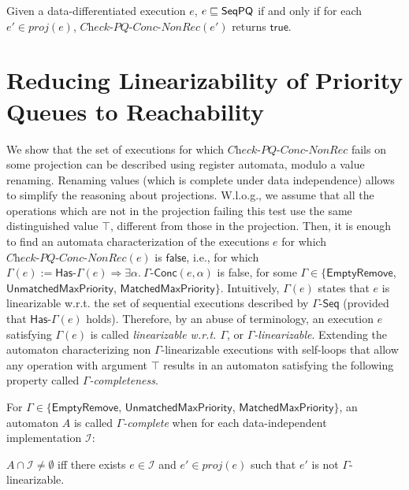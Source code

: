 \documentclass[a4paper,UKenglish]{lipics-v2016}
\begin{document}
\begin{lemma}
\label{lemma:EPQ as multi in MRpri for history}
Given a data-differentiated execution $e$, $e \sqsubseteq \mathsf{SeqPQ}$ if and only if for each $e' \in \textit{proj}(e)$, $\textit{Check-PQ-Conc-NonRec}(e')$ returns $\mathsf{true}$.
\end{lemma}








 







\section{Reducing Linearizability of Priority Queues to Reachability}
\label{sec:co-regular of extended priority queues}

We show that the set of executions for which $\textit{Check-PQ-Conc-NonRec}$ fails on some projection can be described using register automata, modulo a value renaming. Renaming values (which is complete under data independence) allows to simplify the reasoning about projections. W.l.o.g., we assume that all the operations which are not in the projection failing this test use the same distinguished value $\top$, different from those in the projection. Then, it is enough to find an automata characterization of the executions $e$ for which $\textit{Check-PQ-Conc-NonRec}(e)$ is $\mathsf{false}$, i.e., for which 
$\Gamma(e) := \mathsf{Has\text{-}}\Gamma(e) \Rightarrow \exists \alpha.\ \Gamma\mathsf{\text{-}Conc}(e,\alpha)$ is false, for some $\Gamma\in \{\mathsf{EmptyRemove}$, $\mathsf{UnmatchedMaxPriority}$, $\mathsf{MatchedMaxPriority}\}$.
Intuitively, $\Gamma(e)$ states that $e$ is linearizable w.r.t. the set of sequential executions described by $\Gamma\mathsf{\text{-}Seq}$ (provided that $\mathsf{Has\text{-}}\Gamma(e)$ holds). Therefore, by an abuse of terminology, an execution $e$ satisfying $\Gamma(e)$ is called \emph{linearizable w.r.t. $\Gamma$}, or \emph{$\Gamma$-linearizable}.
Extending the automaton characterizing non $\Gamma$-linearizable executions with self-loops that allow any operation with argument $\top$ results in an automaton satisfying the following property called \emph{$\Gamma$-completeness}.

\begin{definition}
For $\Gamma\in \{\mathsf{EmptyRemove}$, $\mathsf{UnmatchedMaxPriority}$, $\mathsf{MatchedMaxPriority}\}$, an automaton $A$ is called \emph{$\Gamma$-complete} when for each data-independent implementation $\mathcal{I}$:

$A \cap \mathcal{I} \neq \emptyset$ iff there exists $e \in \mathcal{I}$ and $e' \in \textit{proj}(e)$ such that $e'$ is not $\Gamma$-linearizable.
\end{definition}
\end{document}
